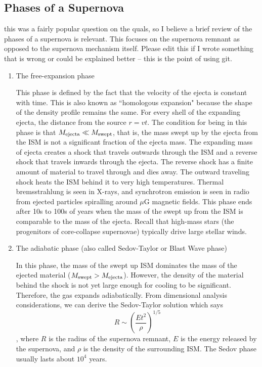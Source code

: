 \subsection{Phases of a Supernova}
 this was a fairly popular question on the quals, so
I believe a brief review of the phases of a supernova is relevant.  This focuses on the
supernova remnant as opposed to the supernova mechanism itself.  Please edit this if I wrote
something that is wrong or could be explained better -- this is the point of using git.
\begin{enumerate}
    \item The free-expansion phase

    This phase is defined by the fact that the velocity of the ejecta is constant with time. This is also known as ``homologous expansion" because the shape of the density profile remains the same. For every shell of the expanding ejecta, the distance from the source $r = vt$. The condition for being in this phase is that $M_{\rm ejecta} \ll M_{\rm swept}$, that is, the mass swept up by the ejecta from the ISM is not a significant fraction of the ejecta mass.
    The expanding mass of ejecta creates a shock that travels outwards through the ISM
    and a reverse shock that travels inwards through the ejecta.  The reverse shock has a finite
    amount of material to travel through and dies away.
    The outward traveling shock heats the ISM behind it to very high temperatures.
    Thermal bremsstrahlung is seen
    in X-rays, and synchrotron emission is seen in radio from ejected
    particles spiralling around $\mu$G magnetic fields.  This phase ends after 10s to 100s of
    years when the mass of the swept up from the ISM is comparable to the mass of the ejecta.
    Recall that high-mass stars (the progenitors of core-collapse supernovae) typically
    drive large stellar winds.

    \item The adiabatic phase (also called Sedov-Taylor or Blast Wave phase)

    In this phase, the mass of the swept up ISM dominates the mass of the ejected material ($M_{\rm swept} > M_{\rm ejecta}$).
    However, the density of the material behind the shock is not yet large enough for cooling
    to be significant.  Therefore, the gas expands adiabatically.
    From dimensional analysis considerations, we can derive the Sedov-Taylor solution which says
    \begin{dmath}
        R \sim \left(\frac{Et^2}{\rho}\right)^{1/5}
    \end{dmath},
    where $R$ is the radius of the supernova remnant, $E$ is the energy released by the
    supernova, and $\rho$ is the density of the surrounding ISM. The Sedov phase usually lasts about $10^4$ years.


\end{enumerate}
